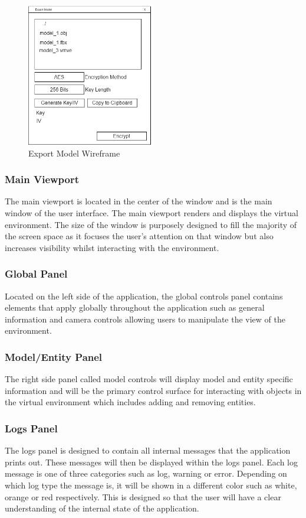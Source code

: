 \documentclass[11pt]{article}
\begin{document}
\begin{figure}[H]
  \centering
  \includegraphics[width=0.5\textwidth]{images/export_model_wireframe.png}
  \caption{Export Model Wireframe}
  \label{fig:export_model_wireframe}
\end{figure}

\subsubsection{Main Viewport}
The main viewport is located in the center of the window and is the main window
of the user interface. The main viewport renders and displays the virtual
environment. The size of the window is purposely designed to fill the majority
of the screen space as it focuses the user's attention on that window but also
increases visibility whilst interacting with the environment.

\subsubsection{Global Panel}
Located on the left side of the application, the global controls panel contains
elements that apply globally throughout the application such as general
information and camera controls allowing users to manipulate the view of the
environment.

\subsubsection{Model/Entity Panel}
The right side panel called model controls will display model and entity
specific information and will be the primary control surface for interacting
with objects in the virtual environment which includes adding and removing
entities.

\subsubsection{Logs Panel}
The logs panel is designed to contain all internal messages that the application
prints out. These messages will then be displayed within the logs panel. Each
log message is one of three categories such as log, warning or error. Depending
on which log type the message is, it will be shown in a different color such as
white, orange or red respectively. This is designed so that the user will have a
clear understanding of the internal state of the application.
\end{document}
